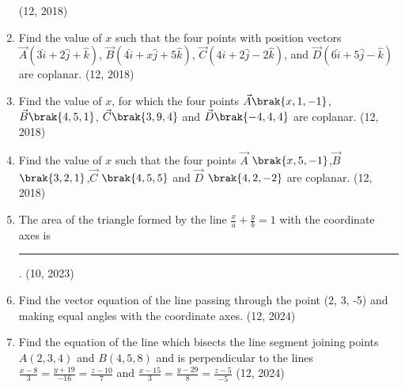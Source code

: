\begin{enumerate}[label=\thesubsection.\arabic*, ref=\thesubsection.\theenumi]
	\hfill (12, 2018)
\item Find the value of $x$ such that the four points with position vectors $\vec{A}(3\hat{i} + 2\hat{j} + \hat{k})$, $\vec{B}(4\hat{i} + x\hat{j} + 5\hat{k})$, $\vec{C}(4\hat{i} + 2\hat{j} - 2\hat{k})$, and $\vec{D}(6\hat{i} + 5\hat{j} - \hat{k})$ are coplanar. \hfill (12, 2018)
\item Find the value of $x$, for which the four points $\vec{A}\brak{x,1,-1}$, $\vec{B}\brak{4,5,1}$, $\vec{C}\brak{3,9,4}$ and $\vec{D}\brak{-4,4,4}$ are coplanar.
\hfill (12, 2018)
\item  Find the value of $x$ such that the four points $\vec{A}$ $\brak{x,5,-1}$,$\vec{B}$ $\brak{3,2,1}$,$\vec{C}$ $\brak{4,5,5}$ and $\vec{D}$ $\brak{4,2,-2}$ are coplanar.
\hfill (12, 2018) 
    \item The area of the triangle formed by the line $ \frac{x}{a} + \frac{y}{b} = 1 $ with the coordinate axes is 
\rule{1cm}{0.1pt}.
    \hfill (10, 2023)
\item Find the vector equation of the line passing through the point (2, 3, -5) and making equal angles with the coordinate axes.
		\hfill (12, 2024)
	\item Find the equation of the line which bisects the line segment joining points $A(2,3,4)$ and $B(4,5,8)$ and is perpendicular to the lines $\frac{x-8}{3} = \frac{y+19}{-16} = \frac{z-10}{7}$ and $\frac{x-15}{3} = \frac{y-29}{8} = \frac{z-5}{-5}$
		\hfill (12, 2024)
\end{enumerate}
